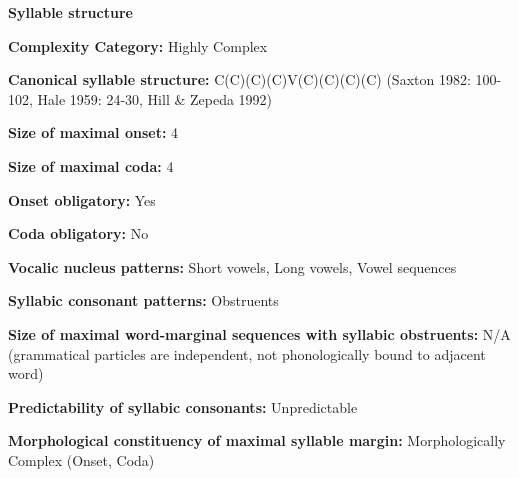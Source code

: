 \begin{styleBody}
\textbf{Syllable structure}
\end{styleBody}

\begin{styleBody}
\textbf{Complexity Category:} Highly Complex
\end{styleBody}

\begin{styleBody}
\textbf{Canonical syllable structure:} C(C)(C)(C)V(C)(C)(C)(C)\textbf{ }(Saxton 1982: 100-102, Hale 1959: 24-30, Hill \& Zepeda 1992)
\end{styleBody}

\begin{styleBody}
\textbf{Size of maximal onset:} 4
\end{styleBody}

\begin{styleBody}
\textbf{Size of maximal coda:} 4
\end{styleBody}

\begin{styleBody}
\textbf{Onset obligatory:} Yes
\end{styleBody}

\begin{styleBody}
\textbf{Coda obligatory:} No
\end{styleBody}

\begin{styleBody}
\textbf{Vocalic nucleus patterns:} Short vowels, Long vowels, Vowel sequences
\end{styleBody}

\begin{styleBody}
\textbf{Syllabic consonant patterns:} Obstruents
\end{styleBody}

\begin{styleBody}
\textbf{Size of maximal word{}-marginal sequences with syllabic obstruents:} N/A (grammatical particles are independent, not phonologically bound to adjacent word)
\end{styleBody}

\begin{styleBody}
\textbf{Predictability of syllabic consonants:} Unpredictable
\end{styleBody}

\begin{styleBody}
\textbf{Morphological constituency of maximal syllable margin:} Morphologically Complex (Onset, Coda)
\end{styleBody}

